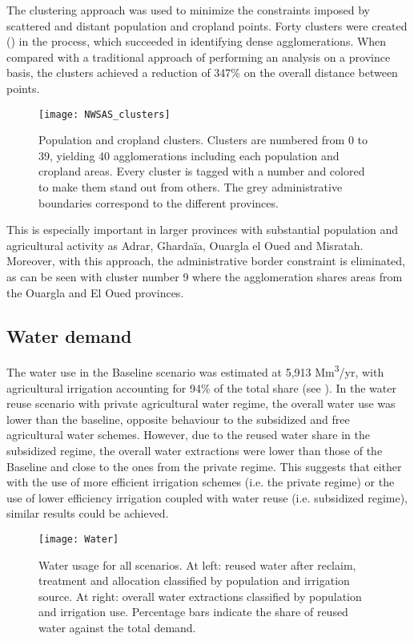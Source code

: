 The clustering approach was used to minimize the constraints imposed by scattered and distant population and cropland points. Forty clusters were created () in the process, which succeeded in identifying dense agglomerations. When compared with a traditional approach of performing an analysis on a province basis, the clusters achieved a reduction of 347\% on the overall distance between points.

\begin{figure*}[!h]
    \centering
	\texttt{[image: NWSAS\_clusters]}
	\caption{Population and cropland clusters. Clusters are numbered from 0 to 39, yielding 40 agglomerations including each population and cropland areas. Every cluster is tagged with a number and colored to make them stand out from others. The grey administrative boundaries correspond to the different provinces.}
	\label{fig:clusters}
\end{figure*}

This is especially important in larger provinces with substantial population and agricultural activity as Adrar, Ghardaïa, Ouargla el Oued and Misratah. Moreover, with this approach, the administrative border constraint is eliminated, as can be seen with cluster number 9 where the agglomeration shares areas from the Ouargla and El Oued provinces. 
\subsection{Water demand}
The water use in the Baseline scenario was estimated at 5,913 Mm\textsuperscript{3}/yr, with agricultural irrigation accounting for 94\% of the total share (see ). In the water reuse scenario with private agricultural water regime, the overall water use was lower than the baseline, opposite behaviour to the subsidized and free agricultural water schemes. However, due to the reused water share in the subsidized regime, the overall water extractions were lower than those of the Baseline and close to the ones from the private regime. This suggests that either with the use of more efficient irrigation schemes (i.e. the private regime) or the use of lower efficiency irrigation coupled with water reuse (i.e. subsidized regime), similar results could be achieved.

\begin{figure*}[!ht]
	\centering
	\texttt{[image: Water]}
	\caption{Water usage for all scenarios. At left: reused water after reclaim, treatment and allocation classified by population and irrigation source. At right: overall water extractions classified by population and irrigation use. Percentage bars indicate the share of reused water against the total demand.}
	\label{fig:water}
\end{figure*}

